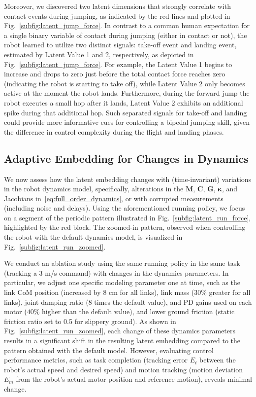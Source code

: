 Moreover, we discovered two latent dimensions that strongly correlate with contact events during jumping, as indicated by the red lines and plotted in Fig.~\ref{subfig:latent_jump_force}. 
In contrast to a common human expectation for a single binary variable of contact during jumping (either in contact or not), the robot learned to utilize two distinct signals: take-off event and landing event, estimated by Latent Value 1 and 2, respectively, as depicted in Fig.~\ref{subfig:latent_jump_force}. 
For example, the Latent Value 1 begins to increase and drops to zero just before the total contact force reaches zero (indicating the robot is starting to take off), while Latent Value 2 only becomes active at the moment the robot lands. 
Furthermore, during the forward jump the robot executes a small hop after it lands, Latent Value 2 exhibits an additional spike during that additional hop.
Such separated signals for take-off and landing could provide more informative cues for controlling a bipedal jumping skill, given the difference in control complexity during the flight and landing phases.


\subsection{Adaptive Embedding for Changes in Dynamics}
We now assess how the latent embedding changes with (time-invariant) variations in the robot dynamics model, specifically, alterations in the $\mathbf{M}$, $\mathbf{C}$, $\mathbf{G}$, $\bm{\kappa}$, and Jacobians in~\eqref{eq:full_order_dynamics}, or with corrupted measurements (including noise and delays).
Using the aforementioned running policy, we focus on a segment of the periodic pattern illustrated in Fig.~\ref{subfig:latent_run_force}, highlighted by the red block. 
The zoomed-in pattern, observed when controlling the robot with the default dynamics model, is visualized in Fig.~\ref{subfig:latent_run_zoomed}. 

We conduct an ablation study using the same running policy in the same task (tracking a 3 m/s command) with changes in the dynamics parameters.
In particular, we adjust one specific modeling parameter one at time, such as the link CoM position (increased by $8$ cm for all links), link mass ($30\%$ greater for all links), joint damping ratio (8 times the default value), and PD gains used on each motor ($40\%$ higher than the default value), and lower ground friction (static friction ratio set to 0.5 for slippery ground). 
As shown in Fig.~\ref{subfig:latent_run_zoomed}, each change of these dynamics parameters results in a significant shift in the resulting latent embedding compared to the pattern obtained with the default model.
However, evaluating control performance metrics, such as task completion (tracking error $E_t$ between the robot's actual speed and desired speed) and motion tracking (motion deviation $E_m$ from the robot's actual motor position and reference motion), reveals minimal change. 

